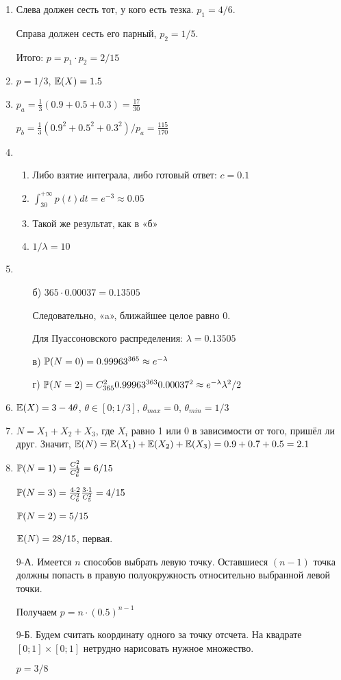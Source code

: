 \begin{enumerate}
\item Слева должен сесть тот, у кого есть тезка. $p_{1} = 4/6$.

Справа должен сесть его парный, $p_{2} = 1/5$.

Итого: $p = p_{1}\cdot p_{2} = 2/15$
\item $p = 1/3$, $\E(X) = 1.5$
\item $p_{a} = \frac{1}{3}(0.9 + 0.5 + 0.3) = \frac{17}{30}$

$p_{b} = \frac{1}{3}(0.9^{2} + 0.5^{2} + 0.3^{2}) / p_{a} = \frac{115}{170}$
\item
\begin{enumerate}
\item Либо взятие интеграла, либо готовый ответ: $c = 0.1$
\item $\int_{30}^{+\infty}p(t)dt=e^{-3}\approx 0.05$
\item Такой же результат, как в «б»
\item $1/\lambda=10$
\end{enumerate}
\item
\begin{enumerate}
\item[б)] $365 \cdot 0.00037 = 0.13505$

Следовательно, «a», ближайшее целое равно 0.

Для Пуассоновского распределения: $\lambda=0.13505$
\item[в)] $\P(N = 0) = 0.99963^{365} \approx e^{-\lambda}$
\item[г)] $\P(N = 2) = C_{365}^{2} 0.99963^{363} 0.00037^{2} \approx e^{-\lambda} \lambda^{2}/2$
\end{enumerate}
\item $\E(X) = 3 - 4\theta$, $\theta \in [0;1/3]$, $\theta_{max} = 0$, $\theta_{min} = 1/3$
\item $N = X_{1} + X_{2} + X_{3}$, где $X_{i}$ равно 1 или 0 в зависимости от того,
пришёл ли друг. Значит, $\E(N) = \E(X_{1}) + \E(X_{2}) + \E(X_{3}) = 0.9 + 0.7 + 0.5 = 2.1$
\item $\P(N = 1) = \frac{C_{4}^{2}}{C_{6}^{2}} = 6/15$

$\P(N = 3) = \frac{4 \cdot 2}{C_{6}^{2}} \frac{3 \cdot 1}{C_{5}^{2}} = 4/15$

$\P(N = 2) = 5/15$

$\E(N) = 28/15$, первая.
\item[9-А.] Имеется $n$ способов выбрать левую точку. Оставшиеся $(n-1)$ точка
должны попасть в правую полуокружность относительно выбранной левой точки.

Получаем $p = n \cdot (0.5)^{n-1}$
\item[9-Б.] Будем считать координату одного за точку отсчета. На квадрате
$[0;1] \times [0;1]$ нетрудно нарисовать нужное множество.

$p = 3/8$
\end{enumerate}



